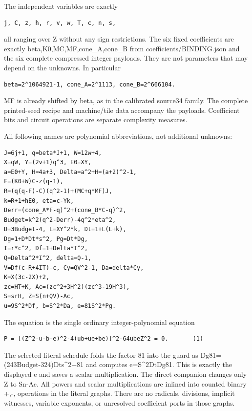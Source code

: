 The independent variables are exactly



\begin{verbatim}
j, C, z, h, r, v, w, T, c, n, s,
\end{verbatim}

all ranging over Z without any sign restrictions. The six fixed coefficients are exactly beta,K0,MC,MF,cone\_\allowbreak{}A,cone\_\allowbreak{}B from coefficients/\allowbreak{}BINDING.json and the six complete compressed integer payloads. They are not parameters that may depend on the unknowns. In particular



\begin{verbatim}
beta=2^1064921-1, cone_A=2^1113, cone_B=2^666104.
\end{verbatim}

MF is already shifted by beta, as in the calibrated source34 family. The complete printed-seed recipe and machine/\allowbreak{}tile data accompany the payloads. Coefficient bits and circuit operations are separate complexity measures.



All following names are polynomial abbreviations, not additional unknowns:



\begin{verbatim}
J=6j+1, q=beta*J+1, W=12w+4,
X=qW, Y=(2v+1)q^3, E0=XY,
a=E0+Y, H=4a+3, Delta=a^2+H=(a+2)^2-1,
F=(K0+W)C-z(q-1),
R=(q(q-F)-C)(q^2-1)+(MC+q*MF)J,
k=R+1+hE0, eta=c-Yk,
Derr=(cone_A*F-q)^2+(cone_B*C-q)^2,
Budget=k^2(q^2-Derr)-4q^2*eta^2,
D=3Budget-4, L=XY^2*k, Dt=1+L(L+k),
Dg=1+D*Dt*s^2, Pg=Dt*Dg,
I=r*c^2, Df=1+Delta*I^2,
Q=Delta^2*I^2, delta=Q-1,
V=Df(c-R+4IT)-c, Cy=QV^2-1, Da=delta*Cy,
K=X(3c-2X)+2,
zc=HT+K, Ac=(zc^2+3H^2)(zc^3-19H^3),
S=srH, Z=S(n+QV)-Ac,
u=9S^2*Df, b=S^2*Da, e=81S^2*Pg.
\end{verbatim}

The equation is the single ordinary integer-polynomial equation



\begin{verbatim}
P = [(Z^2-u-b-e)^2-4(ub+ue+be)]^2-64ubeZ^2 = 0.       (1)
\end{verbatim}

The selected literal schedule folds the factor 81 into the guard as Dg81=\allowbreak{}(243Budget-324)\textasteriskcentered{}\allowbreak{}Dt\textasteriskcentered{}\allowbreak{}s\textasciicircum{}\allowbreak{}2+\allowbreak{}81 and computes e=\allowbreak{}S\textasciicircum{}\allowbreak{}2\textasteriskcentered{}\allowbreak{}Dt\textasteriskcentered{}\allowbreak{}Dg81. This is exactly the displayed e and saves a scalar multiplication. The direct companion changes only Z to Sn-Ac. All powers and scalar multiplications are inlined into counted binary +\allowbreak{},-,\textasteriskcentered{}\allowbreak{} operations in the literal graphs. There are no radicals, divisions, implicit witnesses, variable exponents, or unresolved coefficient ports in those graphs.



